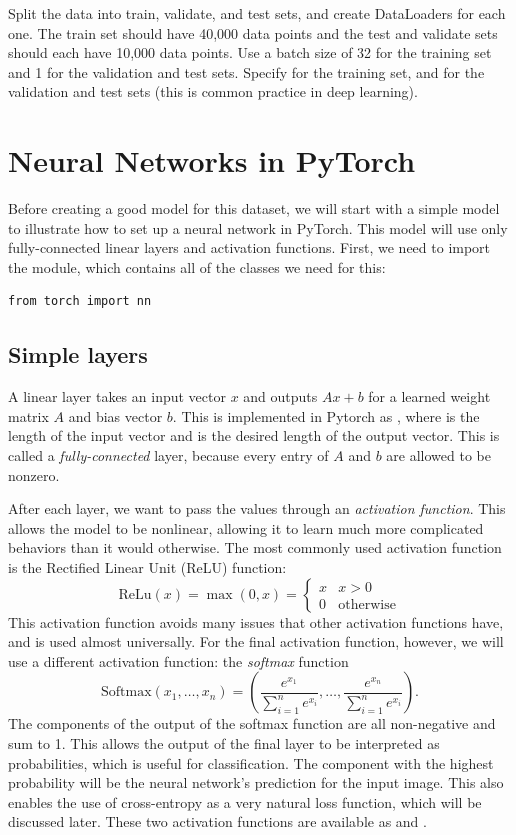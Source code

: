 \begin{problem}
Split the data into train, validate, and test sets, and create DataLoaders for each one.
The train set should have 40,000 data points and the test and validate sets should each have 10,000 data points.
Use a batch size of 32 for the training set and 1 for the validation and test sets.
Specify  for the training set, and  for the validation and test sets (this is common practice in deep learning).
\end{problem}

\section*{Neural Networks in PyTorch}
Before creating a good model for this dataset, we will start with a simple model to illustrate how to set up a neural network in PyTorch.
This model will use only fully-connected linear layers and activation functions.
First, we need to import the  module, which contains all of the classes we need for this:
\begin{lstlisting}
from torch import nn
\end{lstlisting}

\subsection*{Simple layers}
A linear layer takes an input vector \(x\) and outputs \(Ax+b\) for a learned weight matrix \(A\) and bias vector \(b\).
This is implemented in Pytorch as , where  is the length of the input vector and  is the desired length of the output vector.
This is called a \emph{fully-connected} layer, because every entry of \(A\) and \(b\) are allowed to be nonzero.

After each layer, we want to pass the values through an \emph{activation function}.
This allows the model to be nonlinear, allowing it to learn much more complicated behaviors than it would otherwise.
The most commonly used activation function is the Rectified Linear Unit (ReLU) function:
\[
\mathrm{ReLu}(x) = \max(0,x)=\begin{cases}
x  & x>0
\\
0 &\text{otherwise}
\end{cases}
\]
This activation function avoids many issues that other activation functions have, and is used almost universally.
For the final activation function, however, we will use a different activation function: the \emph{softmax} function
\[
\mathrm{Softmax}(x_1,\ldots,x_n)=\left(\frac{e^{x_1}}{\sum_{i=1}^n e^{x_i}},\ldots,\frac{e^{x_n}}{\sum_{i=1}^n e^{x_i}}\right).
\]
The components of the output of the softmax function are all non-negative and sum to 1.
This allows the output of the final layer to be interpreted as probabilities, which is useful for classification.
The component with the highest probability will be the neural network's prediction for the input image.
This also enables the use of cross-entropy as a very natural loss function, which will be discussed later.
These two activation functions are available as  and .

